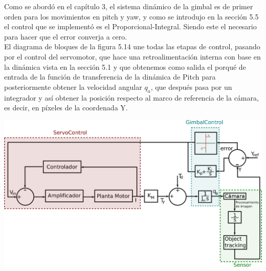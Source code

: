 Como se abordó en el capítulo 3, el sistema dinámico de la gimbal es de primer orden para los movimientos en pitch y yaw, y como se introdujo en la sección 5.5
el control que se implementó es el Proporcional-Integral. Siendo este el necesario para hacer que el error converja a cero.\\
El diagrama de bloques de la figura 5.14 une todas las etapas de control, pasando por el control del servomotor, que hace una retroalimentación interna con base
en la dinámica vista en la sección 5.1 y que obtenemos como salida el porqué de entrada de la función de transferencia de la dinámica de Pitch para posteriormente
obtener la velocidad angular $q_a$, que después pasa por un integrador y así obtener la posición respecto al marco de referencia de la cámara, es decir, en
píxeles de la coordenada Y.
\begin{center}
	\includegraphics[width=1.0\textwidth]{Contenido/Cuerpo/Capitulo5/Fig22.eps}
	\label{Fig4}
\end{center}

